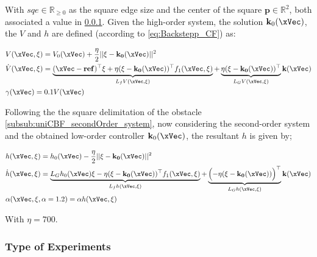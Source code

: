 With  \(sqe \in \mathbb{R}_{\geq 0}\) as the square edge size and the center of the square \(\mathbf{p} \in \mathbb{R}^2\), both associated a value in \ref{subsubsec:orbital_type_of_experiments}. Given the high-order system, the solution \(\mathbf{k}_0(\xVec)\), the  \(V\) and  \(h\) are defined (according to \ref{eq:Backstepp_CF}) as:


\begin{subequations}
   \begin{align}
    &V(\xVec, \xi) = V_0(\xVec) + \frac{\eta}{2} || \xi - \mathbf{k_0(\xVec)}||^2 \label{eq:V_orbital} \\
    &\dot{V}(\xVec, \xi) = \underbrace{(\xVec-\mathbf{ref})^{\top}\xi + \eta(\xi - \mathbf{k_0(\xVec)})^{\top}f_1(\xVec, \xi)}_{L_fV(\xVec, \xi)} + \underbrace{\eta(\xi - \mathbf{k_0(\xVec)})^{\top}}_{L_GV(\xVec, \xi)} \mathbf{k}(\xVec)  \label{eq:dot_V_orbital} \\
    &\gamma(\xVec)  = 0.1 V(\xVec) \label{eq:CLF_gamma_orbital}
\end{align}
\label{eq:CLF_orbital}
\end{subequations}

Following the the square delimitation of the obstacle \ref{subsub:uniCBF_secondOrder_system}, now considering the second-order system and the obtained low-order controller \(\mathbf{k}_0(\xVec)\), the resultant  \(h\) is given by;

\begin{subequations}
   \begin{align}
    &h(\xVec, \xi) = h_0(\xVec) -  \frac{\eta}{2} || \xi - \mathbf{k_0(\xVec)}||^2 \label{eq:h_orbital} \\
    &\dot{h}(\xVec, \xi) = \underbrace{L_Gh_0(\xVec)\xi - \eta (\xi - \mathbf{k_0(\xVec)})^{\top}f_1(\xVec, \xi)}_{L_fh(\xVec, \xi)} + \underbrace{ \Bigl(  - \eta(\xi - \mathbf{k_0(\xVec)})\Bigr)^{\top}}_{L_Gh(\xVec, \xi)}  \mathbf{k}(\xVec)  \label{eq:dot_h_orbital} \\
    &\alpha(\xVec, \xi, \alpha = 1.2)  = \alpha h(\xVec, \xi) \label{eq:CBF_alpha_orbital}
\end{align}
\label{eq:CBF_orbital}
\end{subequations}

With \(\eta = 700\).

\newpage %

\subsubsection{Type of Experiments}
\label{subsubsec:orbital_type_of_experiments}


